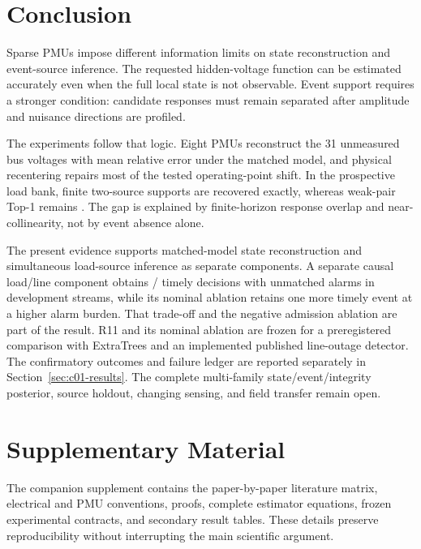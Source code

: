 \section{Conclusion}
\label{sec:conclusion}

Sparse PMUs impose different information limits on state reconstruction and event-source inference. The requested hidden-voltage function can be estimated accurately even when the full local state is not observable. Event support requires a stronger condition: candidate responses must remain separated after amplitude and nuisance directions are profiled.

The experiments follow that logic. Eight PMUs reconstruct the 31 unmeasured bus voltages with \BTwoTVE{} mean relative error under the matched model, and physical recentering repairs most of the tested operating-point shift. In the prospective load bank, finite two-source supports are recovered exactly, whereas weak-pair Top-1 remains \GlobalWeakTopOne{}. The gap is explained by finite-horizon response overlap and near-collinearity, not by event absence alone.

The present evidence supports matched-model state reconstruction and simultaneous load-source inference as separate components. A separate causal load/line component obtains \ContMixTimely{}/\ContMixTotal{} timely decisions with \ContMixExtras{} unmatched alarms in development streams, while its nominal ablation retains one more timely event at a higher alarm burden. That trade-off and the negative admission ablation are part of the result. R11 and its nominal ablation are frozen for a preregistered comparison with ExtraTrees and an implemented published line-outage detector. The confirmatory outcomes and failure ledger are reported separately in Section~\ref{sec:c01-results}. The complete multi-family state/event/integrity posterior, source holdout, changing sensing, and field transfer remain open.

\section*{Supplementary Material}

The companion supplement contains the paper-by-paper literature matrix, electrical and PMU conventions, proofs, complete estimator equations, frozen experimental contracts, and secondary result tables. These details preserve reproducibility without interrupting the main scientific argument.
